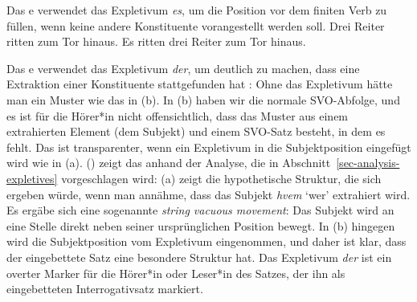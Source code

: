 Das e verwendet das Expletivum \emph{es}, um die Position vor dem finiten Verb zu füllen, wenn keine andere
Konstituente vorangestellt werden soll.
\eal
\ex Drei Reiter ritten zum Tor hinaus.
\ex Es ritten drei Reiter zum Tor hinaus.
\zl

\noindent
Das e verwendet das Expletivum \emph{der}, um deutlich zu machen, dass eine Extraktion einer Konstituente stattgefunden hat
\citep[]{MOe2011a}:
\eal
\label{ex-danish-interrogative-expletive}
\zl
Ohne das Expletivum hätte man ein Muster wie das in (b). In (b) haben wir die
normale SVO-Abfolge, und es ist für die Hörer*in nicht offensichtlich, dass das Muster aus einem extrahierten
Element (dem Subjekt) und einem SVO-Satz besteht, in dem es fehlt. Das ist transparenter, wenn ein
Expletivum in die Subjektposition eingefügt wird wie in (a). () zeigt das anhand der
Analyse, die in Abschnitt~\ref{sec-analysis-expletives} vorgeschlagen wird: (a) zeigt die hypothetische
Struktur, die sich ergeben würde, wenn man annähme, dass das Subjekt \emph{hvem} `wer'
extrahiert wird. Es ergäbe sich eine sogenannte \emph{string vacuous movement}: Das Subjekt wird an eine Stelle
direkt neben seiner ursprünglichen Position bewegt. In (b) hingegen wird die Subjektposition vom Expletivum eingenommen, und
daher ist klar, dass der eingebettete Satz eine besondere Struktur hat. Das Expletivum \emph{der} ist ein overter Marker für
die Hörer*in oder Leser*in des Satzes, der ihn als eingebetteten Interrogativsatz markiert.
\eal
{}
\zl

